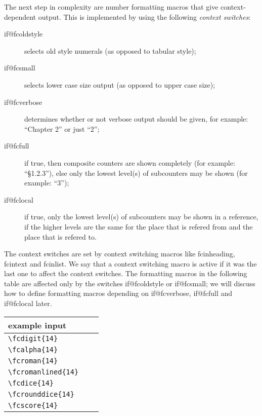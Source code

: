 \documentclass[11pt]{article}
\makeatletter
\def\macroname#1{{\ttfamily\@ttbs#1}}  %
\def\={\verb=}
\def\<#1>{\macroname{#1}}
\makeatother
\begin{document}
The next step in complexity are number formatting macros that give
context-dependent output. This is implemented by using the following
{\it context switches}:
\begin{description}
\item[\<if@fcoldstyle>] selects old style numerals
  (as opposed to tabular style);
\item[\<if@fcsmall>] selects lower case size output
  (as opposed to upper case size);
\item[\<if@fcverbose>] determines whether or not verbose output should
  be given, for example: ``Chapter 2'' or just ``2'';
\item[\<if@fcfull>] if true, then composite counters are shown
  completely (for example: ``\S 1.2.3''), else only the lowest level(s) of
  subcounters may be shown (for example: ``3'');
\item[\<if@fclocal>] if true, only the lowest level(s) of subcounters
  may be shown in a reference, if the higher levels are the same for
  the place that is refered from and the place that is refered to.
\end{description}

The context switches are set by
context switching macros like \<fcinheading>, \<fcintext> and
\<fcinlist>. We say that a context switching macro is active if it was
the last one to affect the context switches.
The formatting macros in the following table are affected only by
the switches \<if@fcoldstyle> or \<if@fcsmall>; we will discuss how to
define formatting macros depending on \<if@fcverbose>, \<if@fcfull>
and \<if@fclocal> later.
\begin{center}
\begin{tabular}{|l|c|c|}\hline
  example input         & \vbox{\hbox{output when\strut}%
                            \hbox{\<fcinheading>\strut}%
                            \hbox{is active\strut}}
                                              & \vbox{\hbox{output when\strut}%
                                                    \hbox{\<fcintext>\strut}%
                                                    \hbox{is active\strut}}  \\
\hline\hline
  \=\fcdigit{14}=      & {\fcinheading\fcdigit{14}} & {\fcintext\fcdigit{14}} \\
\hline
  \=\fcalpha{14}=      & {\fcinheading\fcalpha{14}} & {\fcintext\fcalpha{14}} \\
\hline
  \=\fcroman{14}=      & {\fcinheading\fcroman{14}} & {\fcintext\fcroman{14}} \\
\hline
  \=\fcromanlined{14}= & {\fcinheading\fcromanlined{14}}
                                              & {\fcintext\fcromanlined{14}} \\
\hline
  \=\fcdice{14}=       & {\fcinheading\fcdice{14}}  & {\fcintext\fcdice{14}}  \\
\hline
  \=\fcrounddice{14}= & {\fcinheading\fcrounddice{14}} & {\fcintext\fcrounddice{14}} \\
\hline
  \=\fcscore{14}=      & {\fcinheading\fcscore{14}} & {\fcintext\fcscore{14}} \\
\hline
\end{tabular}
\end{center}
\end{document}
